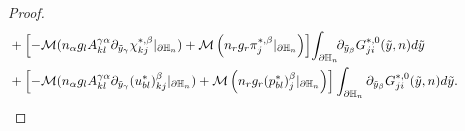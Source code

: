 \documentclass[11pt, reqno]{amsart}
\theoremstyle{definition}
\theoremstyle{remark}
\numberwithin{equation}{section}
\begin{document}
\begin{proof}[Proof]
\begin{align*}
			&+\left[-\mathcal{M}(n_\alpha g_l A^{\gamma\alpha}_{kl}\partial_{ \tilde{y}_\gamma}  \chi_{kj}^{*,\beta}|_{\partial\mathbb{H}_n}) + \mathcal{M}\left( n_r g_r \pi_{j}^{*,\beta} |_{\partial\mathbb{H}_n} \right) \right]\!
			\int_{\partial\mathbb{H}_n}\!\!\partial_{\tilde{y}_\beta} G^{*,0}_{ji}(\tilde{y},n) d\tilde{y} \\
			&+ \left[ -\mathcal{M}(n_\alpha g_l A^{\gamma\alpha}_{kl}\partial_{ \tilde{y}_\gamma}  (u^*_{bl})^{\beta}_{kj}|_{\partial\mathbb{H}_n})+
			\mathcal{M}\left( n_r g_r (p^*_{bl})^{\beta}_{j}|_{\partial\mathbb{H}_n} \right) \right]
			\int_{\partial\mathbb{H}_n}  \partial_{\tilde{y}_\beta}G^{*,0}_{ji}(\tilde{y},n) d\tilde{y}.\qquad \qquad\qedhere\\
		\end{align*}
		
	\end{proof}
	
\end{document}
